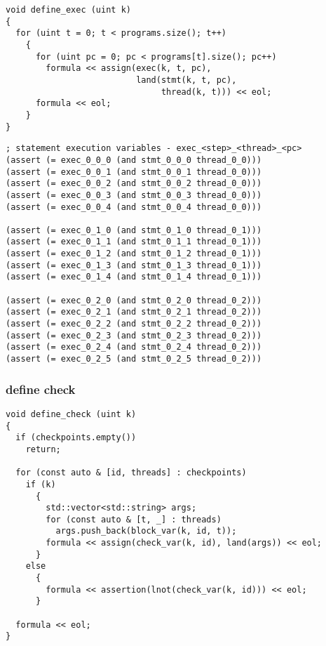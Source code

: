 \begin{lstlisting}[style=c++]
void define_exec (uint k)
{
  for (uint t = 0; t < programs.size(); t++)
    {
      for (uint pc = 0; pc < programs[t].size(); pc++)
        formula << assign(exec(k, t, pc),
                          land(stmt(k, t, pc),
                               thread(k, t))) << eol;
      formula << eol;
    }
}
\end{lstlisting}

\begin{lstlisting}[language=SMTLib]
; statement execution variables - exec_<step>_<thread>_<pc>
(assert (= exec_0_0_0 (and stmt_0_0_0 thread_0_0)))
(assert (= exec_0_0_1 (and stmt_0_0_1 thread_0_0)))
(assert (= exec_0_0_2 (and stmt_0_0_2 thread_0_0)))
(assert (= exec_0_0_3 (and stmt_0_0_3 thread_0_0)))
(assert (= exec_0_0_4 (and stmt_0_0_4 thread_0_0)))

(assert (= exec_0_1_0 (and stmt_0_1_0 thread_0_1)))
(assert (= exec_0_1_1 (and stmt_0_1_1 thread_0_1)))
(assert (= exec_0_1_2 (and stmt_0_1_2 thread_0_1)))
(assert (= exec_0_1_3 (and stmt_0_1_3 thread_0_1)))
(assert (= exec_0_1_4 (and stmt_0_1_4 thread_0_1)))

(assert (= exec_0_2_0 (and stmt_0_2_0 thread_0_2)))
(assert (= exec_0_2_1 (and stmt_0_2_1 thread_0_2)))
(assert (= exec_0_2_2 (and stmt_0_2_2 thread_0_2)))
(assert (= exec_0_2_3 (and stmt_0_2_3 thread_0_2)))
(assert (= exec_0_2_4 (and stmt_0_2_4 thread_0_2)))
(assert (= exec_0_2_5 (and stmt_0_2_5 thread_0_2)))
\end{lstlisting}

\subsubsection{define check}

\begin{lstlisting}[style=c++]
void define_check (uint k)
{
  if (checkpoints.empty())
    return;

  for (const auto & [id, threads] : checkpoints)
    if (k)
      {
        std::vector<std::string> args;
        for (const auto & [t, _] : threads)
          args.push_back(block_var(k, id, t));
        formula << assign(check_var(k, id), land(args)) << eol;
      }
    else
      {
        formula << assertion(lnot(check_var(k, id))) << eol;
      }

  formula << eol;
}
\end{lstlisting}

